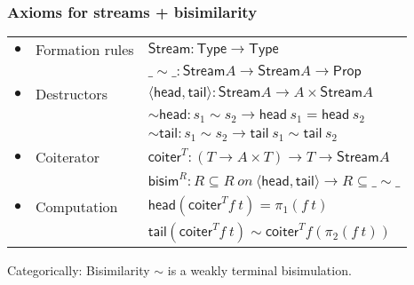 \documentclass[
]
{beamer}
\newcommand{\constfont}[1]{\ensuremath{\mathsf{#1}}}
\newcommand{\stream}{\constfont{Stream}}
\newcommand{\head}{\constfont{top}}
\newcommand{\tail}{\constfont{rest}}
\newcommand{\shead}{\constfont{head}}
\newcommand{\stail}{\constfont{tail}}
\newcommand{\bisim}{\constfont{bisim}}
\newcommand{\coiter}{\constfont{coiter}}
\newcommand{\ibisim}{\ensuremath{\_\sim\_}}
\newcommand{\hbisim}{\ensuremath{\sim\!\constfont{head}}}
\newcommand{\tbisim}{\ensuremath{\sim\!\constfont{tail}}}
\newcommand{\Prop}{\constfont{Prop}}
\newcommand{\Type}{\constfont{Type}}
\begin{document}
\begin{frame}
  \frametitle{Axioms for streams + bisimilarity}
  \begin{tabular}{lll}
	  $\bullet$ & Formation rules & $\stream : \Type \to \Type $ \\
			   &                 & $\ibisim : \stream A \to \stream A \to \Prop $ \\[.75em]
	  $\bullet$ & Destructors     & $\langle \shead , \stail \rangle : \stream A \to A \times \stream A $ \\
	          &                 & $\hbisim : s_1 \sim s_2 \to \shead\ s_1 = \shead\ s_2 $ \\
			 &                 & $\tbisim : s_1 \sim s_2 \to \stail\ s_1 \sim \stail\ s_2 $ \\[.75em]
       $\bullet$  & Coiterator      & $\coiter^T : (T \to A \times T) \to T \to \stream A$ \\
				       &                 & $\bisim^R : R \subseteq R\ on\ \langle \shead , \stail \rangle \to R \subseteq \ibisim $ \\[.75em]
	  $\bullet$   & Computation     & $\shead (\coiter^T f\ t) = \pi_1 (f\ t)$ \\
				    &                 &  $\stail (\coiter^T f\ t) \sim \coiter^T f (\pi_2 (f\ t))$
  \end{tabular}
  \vspace{0.5em}
  
  Categorically: Bisimilarity $\sim$ is a weakly terminal bisimulation.
  
\end{frame}
\end{document}
